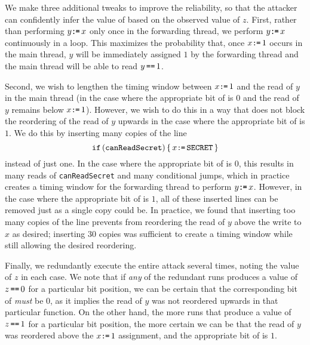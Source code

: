 We make three additional tweaks to improve the reliability, so that the attacker
can confidently infer the value of {\SEC} based on the observed value of $z$.
  First, rather than performing $y\texttt{:}\mkern-1mu\texttt{=}\, x$ only once in the forwarding thread,
we perform $y\texttt{:}\mkern-1mu\texttt{=}\, x$ continuously in a loop.
This maximizes the probability that, once $x\texttt{:}\mkern-1mu\texttt{=}\, 1$ occurs in the main
thread, $y$ will be immediately assigned $1$ by the forwarding thread
and the main thread will be able to read $y\,\texttt{==}\, 1$.

Second, we wish to lengthen the timing window between $x\texttt{:}\mkern-1mu\texttt{=}\, 1$ and the
read of $y$ in the main thread (in the case where the appropriate bit of
{\SEC} is $0$ and the read of $y$ remains below $x\texttt{:}\mkern-1mu\texttt{=}\, 1$).
However, we wish to do this in a way that does not block the reordering of the
read of $y$ upwards in the case where the appropriate bit of {\SEC}
is $1$.
We do this by inserting many copies of the line
\[
  \texttt{if}\, (\texttt{canReadSecret}) \,\{\, x\texttt{:}\mkern-1mu\texttt{=}\,\texttt{SECRET}\,\}
\]
instead of just one.
In the case where the appropriate bit of {\SEC} is $0$, this
results in many reads of \verb|canReadSecret| and many conditional jumps,
which in practice creates a timing window for the forwarding thread to perform
$y\texttt{:}\mkern-1mu\texttt{=}\, x$.
However, in the case where the appropriate bit of {\SEC} is $1$,
all of these inserted lines can be removed just as a single copy could be.
In practice, we found that inserting too many copies of the line prevents
{\GCC} from reordering the read of $y$ above the write to $x$ as
desired; inserting $30$ copies was sufficient to create a timing window
while still allowing the desired reordering.

Finally, we redundantly execute the entire attack several times, noting the
value of $z$ in each case.
We note that if \emph{any} of the redundant runs produces a value of
$z\,\texttt{==}\,0$ for a particular bit position, we can be certain that the
corresponding bit of {\SEC} \emph{must} be $0$, as it implies the
read of $y$ was not reordered upwards in that particular function.
On the other hand, the more runs that produce a value of $z\,\texttt{==}\,1$ for a
particular bit position, the more certain we can be that the read of $y$
was reordered above the $x\texttt{:}\mkern-1mu\texttt{=}\, 1$ assignment, and the appropriate bit of
{\SEC} is $1$.


